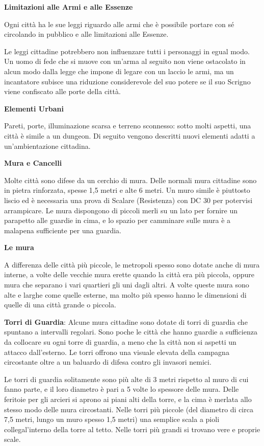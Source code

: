 \documentclass[a4paper,11pt,twoside,openany]{book}
\begin{document}
\textbf{Limitazioni alle Armi e alle Essenze}

Ogni città ha le sue leggi riguardo alle armi che è possibile portare con sé circolando in pubblico e alle limitazioni alle Essenze.

Le leggi cittadine potrebbero non influenzare tutti i personaggi in egual modo. Un uomo di fede che si muove con un'arma al seguito non viene ostacolato in alcun modo dalla legge che impone di legare con un laccio le armi, ma un incantatore subisce una riduzione considerevole del suo potere se il suo Scrigno viene confiscato alle porte della città.

\textbf{Elementi Urbani}

Pareti, porte, illuminazione scarsa e terreno sconnesso: sotto molti aspetti, una città è simile a un dungeon. Di seguito vengono descritti nuovi elementi adatti a un'ambientazione cittadina.

\textbf{Mura e Cancelli}

Molte città sono difese da un cerchio di mura. Delle normali mura cittadine sono in pietra rinforzata, spesse 1,5 metri e alte 6 metri. Un muro simile è piuttosto liscio ed è necessaria una prova di Scalare (Resistenza) con DC 30 per potervisi arrampicare. Le mura dispongono di piccoli merli su un lato per fornire un parapetto alle guardie in cima, e lo spazio per camminare sulle mura è a malapena sufficiente per una guardia.

\textbf{Le mura}

A differenza delle città più piccole, le metropoli spesso sono dotate anche di mura interne, a volte delle vecchie mura erette quando la città era più piccola, oppure mura che separano i vari quartieri gli uni dagli altri. A volte queste mura sono alte e larghe come quelle esterne, ma molto più spesso hanno le dimensioni di quelle di una città grande o piccola.

\textbf{Torri di Guardia}: Alcune mura cittadine sono dotate di torri di guardia che spuntano a intervalli regolari. Sono poche le città che hanno guardie a sufficienza da collocare su ogni torre di guardia, a meno che la città non si aspetti un attacco dall'esterno. Le torri offrono una visuale elevata della campagna circostante oltre a un baluardo di difesa contro gli invasori nemici.

Le torri di guardia solitamente sono più alte di 3 metri rispetto al muro di cui fanno parte, e il loro diametro è pari a 5 volte lo spessore delle mura. Delle feritoie per gli arcieri si aprono ai piani alti della torre, e la cima è merlata allo stesso modo delle mura circostanti. Nelle torri più piccole (del diametro di circa 7,5 metri, lungo un muro spesso 1,5 metri) una semplice scala a pioli collegal'interno della torre al tetto. Nelle torri più grandi si trovano vere e proprie scale.
\end{document}
